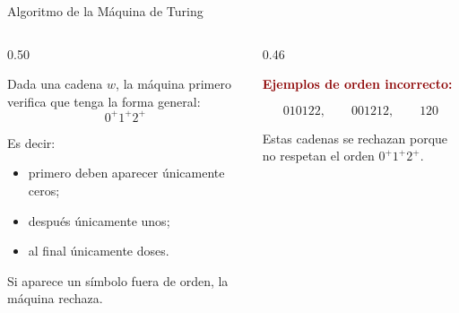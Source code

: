 \documentclass[aspectratio=1610, 12pt]{beamer}
\begin{document}
\begin{frame}[t]{Algoritmo de la Máquina de Turing}
\vspace{4pt}
\begin{columns}[T]

  \begin{column}{0.50\textwidth}
    \begin{defbox}
      \footnotesize
      Dada una cadena $w$, la máquina primero verifica que tenga
      la forma general:
      \[
        0^+1^+2^+
      \]

      \vspace{2pt}
      Es decir:

      \begin{itemize}\setlength{\itemsep}{3pt}
        \item primero deben aparecer únicamente ceros;
        \item después únicamente unos;
        \item al final únicamente doses.
      \end{itemize}

      \vspace{4pt}
      Si aparece un símbolo fuera de orden, la máquina rechaza.
    \end{defbox}
  \end{column}

  \begin{column}{0.46\textwidth}
    \begin{alertbox}
      \small
      \textcolor{DarkRed}{\textbf{Ejemplos de orden incorrecto:}}

      \vspace{4pt}
      \[
        010122,\qquad 001212,\qquad 120
      \]

      \vspace{4pt}
      Estas cadenas se rechazan porque no respetan el orden
      $0^+1^+2^+$.
    \end{alertbox}
  \end{column}

\end{columns}
\end{frame}
\end{document}
